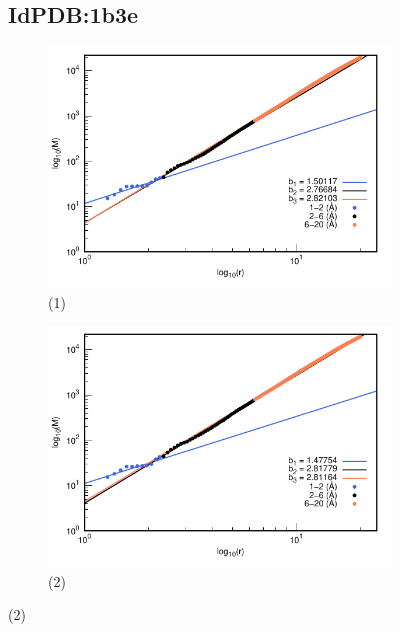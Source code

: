 \begin{figure}[H]
	\subsection*{IdPDB:1b3e}
	
	\hspace{-0.3cm} 
	\begin{subfigure}{0.49\textwidth}
		\centering
		\includegraphics[width=\linewidth,page=1]{graphs/PDBs/1b3e/1b3eaddH.pdf}
		\caption{(1)}
	\end{subfigure}
	\hspace{0.2cm}
	\begin{subfigure}{0.49\textwidth}
		\centering
		\includegraphics[width=\linewidth,page=1]{graphs/PDBs/1b3e/1b3eEm.pdf}
		\caption{(2)}
	\end{subfigure}
	

\end{figure}
